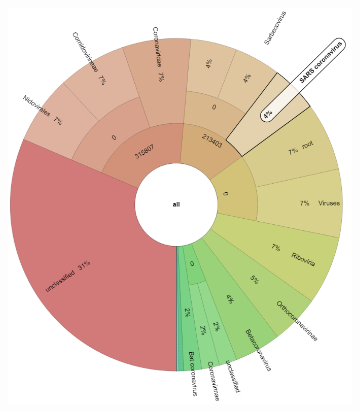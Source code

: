    \begin{figure}[H]
        \centering
        \begin{subfigure}[b]{0.3\textwidth}
        \includegraphics[width=1\textwidth]{figures/results/real/krona/krona-us-sSRR17578350.png}
        \label{fig:results:real:krona-us-a}
        \end{subfigure}
        \hfill
        \begin{subfigure}[b]{0.3\textwidth}

\end{subfigure}
\end{figure}
